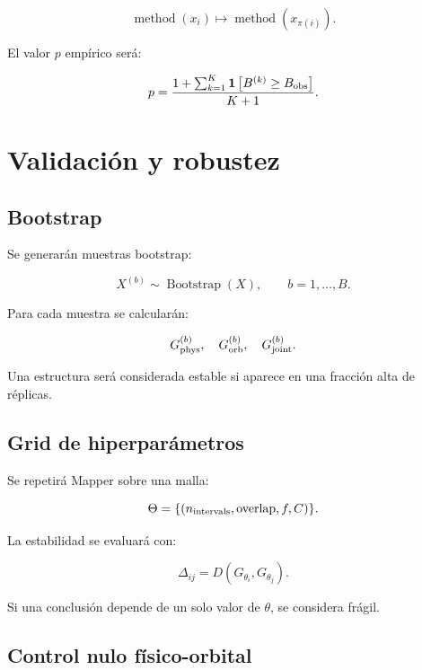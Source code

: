\documentclass[11pt,letterpaper]{article}
\newcommand{\phys}{\rm phys}
\newcommand{\orb}{\rm orb}
\newcommand{\joint}{\rm joint}
\begin{document}
\begin{equation}
\operatorname{method}(x_i)\mapsto \operatorname{method}(x_{\pi(i)}).
\end{equation}

El valor $p$ empírico será:

\begin{equation}
p=\frac{1+\sum_{k=1}^{K}\mathbf{1}\left[B^{(k)}\geq B_{\rm obs}\right]}{K+1}.
\end{equation}

\section{Validación y robustez}

\subsection{Bootstrap}

Se generarán muestras bootstrap:

\begin{equation}
X^{(b)}\sim \operatorname{Bootstrap}(X),\qquad b=1,\dots,B.
\end{equation}

Para cada muestra se calcularán:

\begin{equation}
G_{\phys}^{(b)},\quad G_{\orb}^{(b)},\quad G_{\joint}^{(b)}.
\end{equation}

Una estructura será considerada estable si aparece en una fracción alta de réplicas.

\subsection{Grid de hiperparámetros}

Se repetirá Mapper sobre una malla:

\begin{equation}
\Theta=\{(n_{\rm intervals},\operatorname{overlap},f,C)\}.
\end{equation}

La estabilidad se evaluará con:

\begin{equation}
\Delta_{ij}=D(G_{\theta_i},G_{\theta_j}).
\end{equation}

Si una conclusión depende de un solo valor de $\theta$, se considera frágil.

\subsection{Control nulo físico-orbital}
\end{document}
